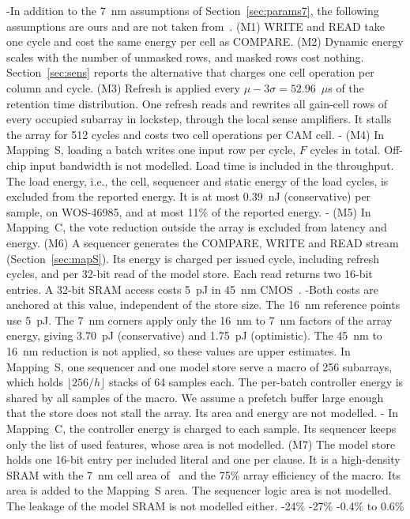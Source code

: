\hyp{In addition to the 7~nm assumptions of Section~\ref{sec:params7}, the following assumptions are ours and are not taken from~\cite{levi2026gainp}.
(M1) WRITE and READ take one cycle and cost the same energy per cell as COMPARE.
(M2) Dynamic energy scales with the number of unmasked rows, and masked rows cost nothing. Section~\ref{sec:sens} reports the alternative that charges one cell operation per column and cycle.
(M3) Refresh is applied every $\mu-3\sigma=52.96$~$\mu$s of the retention time distribution. One refresh reads and rewrites all gain-cell rows of every occupied subarray in lockstep, through the local sense amplifiers. It stalls the array for 512 cycles and costs two cell operations per CAM cell.}  \hyp{
(M4) In Mapping~S, loading a batch writes one input row per cycle, $F$ cycles in total. Off-chip input bandwidth is not modelled. Load time is included in the throughput. The load energy, i.e., the cell, sequencer and static energy of the load cycles, is excluded from the reported energy. It is at most 0.39~nJ (conservative) per sample, on WOS-46985, and at most 11\% of the reported energy.} \hyp{
(M5) In Mapping~C, the vote reduction outside the array is excluded from latency and energy.
(M6) A sequencer generates the COMPARE, WRITE and READ stream (Section~\ref{sec:mapS}). Its energy is charged per issued cycle, including refresh cycles, and per 32-bit read of the model store. Each read returns two 16-bit entries.} A 32-bit SRAM access costs 5~pJ in 45~nm CMOS~\cite{han2016deep}. \hyp{Both costs are anchored at this value, independent of the store size. The 16~nm reference points use 5~pJ. The 7~nm corners apply only the 16~nm to 7~nm factors of the array energy, giving 3.70~pJ (conservative) and 1.75~pJ (optimistic). The 45~nm to 16~nm reduction is not applied, so these values are upper estimates. In Mapping~S, one sequencer and one model store serve a macro of 256 subarrays, which holds $\lfloor 256/h\rfloor$ stacks of 64 samples each. The per-batch controller energy is shared by all samples of the macro. We assume a prefetch buffer large enough that the store does not stall the array. Its area and energy are not modelled.}  \hyp{ In Mapping~C, the controller energy is charged to each sample. Its sequencer keeps only the list of used features, whose area is not modelled.
(M7) The model store holds one 16-bit entry per included literal and one per clause. It is a high-density SRAM with the 7~nm cell area of~\cite{wu2016n7} and the 75\% array efficiency of the \gainp{} macro. Its area is added to the Mapping~S area. The sequencer logic area is not modelled. The leakage of the model SRAM is not modelled either.}  \hyp{24\%}  \hyp{27\%}  \hyp{0.4\% to 0.6\%} 
